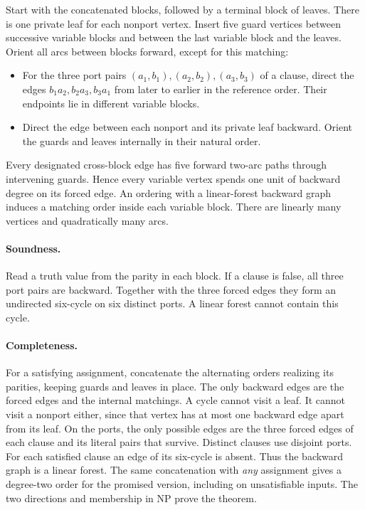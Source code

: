 \documentclass[10pt]{article}
\begin{document}
Start with the concatenated blocks, followed by a terminal block of leaves. There is one private leaf for each nonport vertex. Insert five guard vertices between successive variable blocks and between the last variable block and the leaves. Orient all arcs between blocks forward, except for this matching:
\begin{itemize}
\item For the three port pairs $(a_1,b_1),(a_2,b_2),(a_3,b_3)$ of a clause, direct the edges $b_1a_2,b_2a_3,b_3a_1$ from later to earlier in the reference order. Their endpoints lie in different variable blocks.
\item Direct the edge between each nonport and its private leaf backward. Orient the guards and leaves internally in their natural order.
\end{itemize}
Every designated cross-block edge has five forward two-arc paths through intervening guards. Hence every variable vertex spends one unit of backward degree on its forced edge. An ordering with a linear-forest backward graph induces a matching order inside each variable block. There are linearly many vertices and quadratically many arcs.

\paragraph{Soundness.} Read a truth value from the parity in each block. If a clause is false, all three port pairs are backward. Together with the three forced edges they form an undirected six-cycle on six distinct ports. A linear forest cannot contain this cycle.

\paragraph{Completeness.} For a satisfying assignment, concatenate the alternating orders realizing its parities, keeping guards and leaves in place. The only backward edges are the forced edges and the internal matchings. A cycle cannot visit a leaf. It cannot visit a nonport either, since that vertex has at most one backward edge apart from its leaf. On the ports, the only possible edges are the three forced edges of each clause and its literal pairs that survive. Distinct clauses use disjoint ports. For each satisfied clause an edge of its six-cycle is absent. Thus the backward graph is a linear forest. The same concatenation with \emph{any} assignment gives a degree-two order for the promised version, including on unsatisfiable inputs. The two directions and membership in NP prove the theorem.
\end{document}
